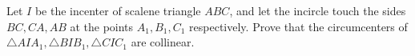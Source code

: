 Let $I$ be the incenter of scalene triangle $ABC$, and let the incircle touch the sides $BC,CA,AB$ at the points $A_1,B_1,C_1$ respectively. Prove that the circumcenters of $\triangle{AIA_1},\triangle{BIB_1},\triangle{CIC_1}$ are collinear.